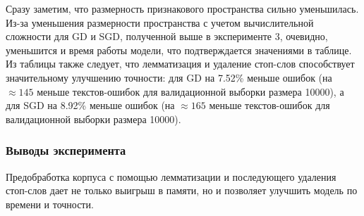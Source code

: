 Сразу заметим, что размерность признакового пространства сильно уменьшилась. Из-за уменьшения размерности пространства с учетом вычислительной сложности для GD и SGD, полученной выше в эксперименте 3, очевидно, уменьшится и время работы модели, что подтверждается значениями в таблице. Из таблицы также следует, что лемматизация и удаление стоп-слов способствует значительному улучшению точности: для GD на 7.52\% меньше ошибок (на $\approx 145$ меньше текстов-ошибок для валидационной выборки размера 10000), а для SGD на 8.92\% меньше ошибок (на $\approx 165$ меньше текстов-ошибок для валидационной выборки размера 10000). 
\subsubsection{Выводы эксперимента}
Предобработка корпуса с помощью лемматизации и последующего удаления стоп-слов дает не только выигрыш в памяти, но и позволяет улучшить модель по времени и точности.
